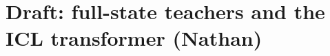 \documentclass[10pt]{article}
\begin{document}
\section*{Draft: full-state teachers and the ICL transformer (Nathan)}




\end{document}
